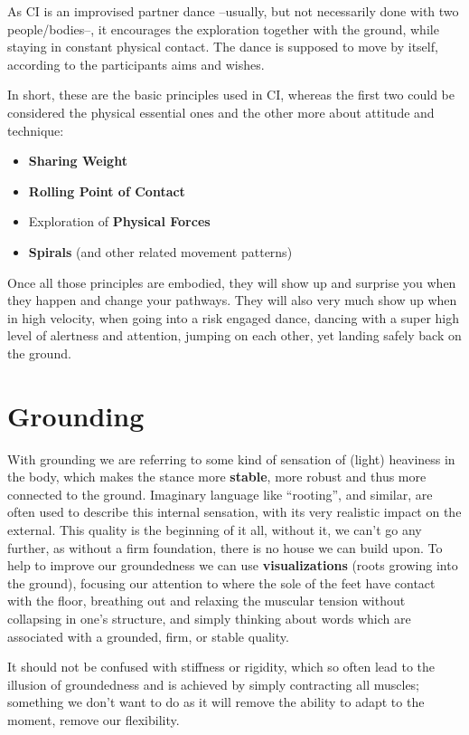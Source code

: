 As CI is an improvised partner dance --usually, but not necessarily done with two people/bodies--, it encourages the exploration together with the ground, while staying in constant physical contact.
The dance is supposed to move by itself, according to the participants aims and wishes.

In short, these are the basic principles used in CI, whereas the first two could be considered the physical essential ones and the other more about attitude and technique:

\begin{itemize}
    \item \textbf{Sharing Weight}
    \item \textbf{Rolling Point of Contact}
    \item Exploration of \textbf{Physical Forces}
    \item \textbf{Spirals} (and other related movement patterns)
\end{itemize}

Once all those principles are embodied, they will show up and surprise you when they happen and change your pathways.
They will also very much show up when in high velocity, when going into a risk engaged dance, dancing with a super high level of alertness and attention, jumping on each other, yet landing safely back on the ground.

\section{Grounding}\label{sec:grounding}

With grounding we are referring to some kind of sensation of (light) heaviness in the body, which makes the stance more \textbf{stable}, more robust and thus more connected to the ground.
Imaginary language like ``rooting'', and similar, are often used to describe this internal sensation, with its very realistic impact on the external.
This quality is the beginning of it all, without it, we can't go any further, as without a firm foundation, there is no house we can build upon.
To help to improve our groundedness we can use \textbf{visualizations} (roots growing into the ground), focusing our attention to where the sole of the feet have contact with the floor, breathing out and relaxing the muscular tension without collapsing in one's structure, and simply thinking about words which are associated with a grounded, firm, or stable quality.

It should not be confused with stiffness or rigidity, which so often lead to the illusion of groundedness and is achieved by simply contracting all muscles; something we don't want to do as it will remove the ability to adapt to the moment, remove our flexibility.

